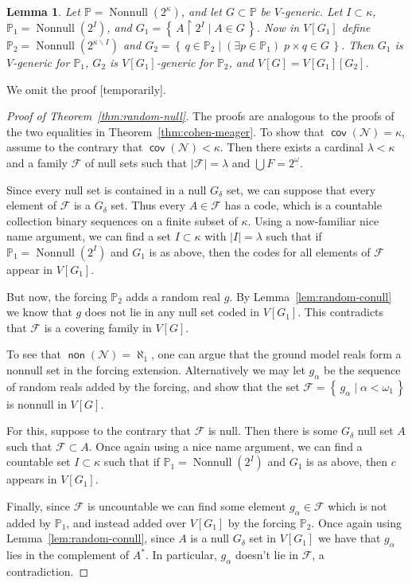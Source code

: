 \documentclass[11pt,oneside]{amsbook}
\newcommand{\set}[1]{\left\{\,#1\,\right\}}
\newcommand{\PP}{\mathbb P}
\newcommand{\Null}{\mathcal N}
\DeclareMathOperator{\non}{\mathsf{non}}
\DeclareMathOperator{\cov}{\mathsf{cov}}
\DeclareMathOperator{\Nonnull}{Nonnull}
\theoremstyle{definition}
\theoremstyle{plain}
\newtheorem{lem}[thm]{Lemma}
\theoremstyle{definition}
\theoremstyle{remark}
\numberwithin{equation}{section}
\numberwithin{figure}{section}
\begin{document}
\begin{lem}
  Let $\PP=\Nonnull(2^\kappa)$, and let $G\subset\PP$ be $V$-generic. Let $I\subset\kappa$, $\PP_1=\Nonnull(2^I)$, and $G_1=\set{A\restriction2^I\mid A\in G}$. Now in $V[G_1]$ define $\PP_2=\Nonnull(2^{\kappa\smallsetminus I})$ and $G_2=\set{q\in\PP_2\mid(\exists p\in\PP_1)\;p\times q\in G}$. Then $G_1$ is $V$-generic for $\PP_1$, $G_2$ is $V[G_1]$-generic for $\PP_2$, and $V[G]=V[G_1][G_2]$.
\end{lem}

We omit the proof [temporarily].

\begin{proof}[Proof of Theorem~\ref{thm:random-null}]
  The proofs are analogous to the proofs of the two equalities in Theorem~\ref{thm:cohen-meager}. To show that $\cov(\Null)=\kappa$, assume to the contrary that $\cov(\Null)<\kappa$. Then there exists a cardinal $\lambda<\kappa$ and a family $\mathcal F$ of null sets such that $|\mathcal F|=\lambda$ and $\bigcup F=2^\omega$.

  Since every null set is contained in a null $G_\delta$ set, we can suppose that every element of $\mathcal F$ is a $G_\delta$ set. Thus every $A\in\mathcal F$ has a code, which is a countable collection binary sequences on a finite subset of $\kappa$. Using a now-familiar nice name argument, we can find a set $I\subset\kappa$ with $|I|=\lambda$ such that if $\PP_1=\Nonnull(2^I)$ and $G_1$ is as above, then the codes for all elements of $\mathcal F$ appear in $V[G_1]$.

  But now, the forcing $\PP_2$ adds a random real $g$. By Lemma~\ref{lem:random-conull} we know that $g$ does not lie in any null set coded in $V[G_1]$. This contradicts that $\mathcal F$ is a covering family in $V[G]$.

  To see that $\non(\Null)=\aleph_1$, one can argue that the ground model reals form a nonnull set in the forcing extension. Alternatively we may let $g_\alpha$ be the sequence of random reals added by the forcing, and show that the set $\mathcal F=\set{g_\alpha\mid\alpha<\omega_1}$ is nonnull in $V[G]$.

  For this, suppose to the contrary that $\mathcal F$ is null. Then there is some $G_\delta$ null set $A$ such that $\mathcal F\subset A$. Once again using a nice name argument, we can find a countable set $I\subset\kappa$ such that if $\PP_1=\Nonnull(2^I)$ and $G_1$ is as above, then $c$ appears in $V[G_1]$.

  Finally, since $\mathcal F$ is uncountable we can find some element $g_\alpha\in\mathcal F$ which is not added by $\PP_1$, and instead added over $V[G_1]$ by the forcing $\PP_2$. Once again using Lemma~\ref{lem:random-conull}, since $A$ is a null $G_\delta$ set in $V[G_1]$ we have that $g_\alpha$ lies in the complement of $A^*$. In particular, $g_\alpha$ doesn't lie in $\mathcal F$, a contradiction.
\end{proof}
\end{document}
